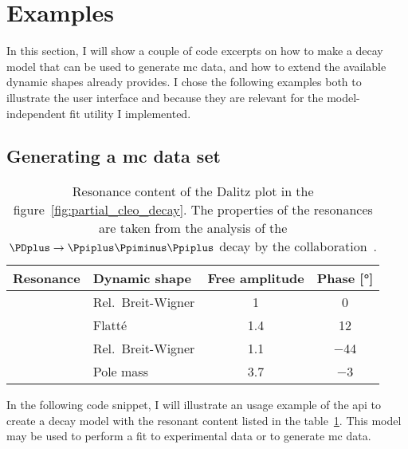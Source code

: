     \section{Examples}

        In this section, I will show a couple of code excerpts on how to make a decay model that can be used to generate \ac{mc} data, and how to extend the available dynamic shapes  already provides.
        I chose the following examples both to illustrate the user interface and because they are relevant for the model-independent fit utility I implemented.

        \subsection{Generating a \acs{mc} data set}
        

        \begin{table}
            \centering
            \caption{Resonance content of the Dalitz plot in the figure~\ref{fig:partial_cleo_decay}. The properties of the resonances are taken from the analysis of the $\PDplus\to\Ppiplus\Ppiminus\Ppiplus$ decay by the \cleo{} collaboration~\cite{PhysRevD.76.012001}.}
            \label{tab:cleo_model}
            \begin{tabular}{llcc}
                \toprule
                Resonance &Dynamic shape &Free amplitude &Phase [\si{\degree}]\\
                \midrule
                \Prhozero{} &Rel.~Breit-Wigner &\num{1}   &\num{0}   \\
                \Pfnez{}    &Flatté            &\num{1.4} &\num{12}  \\
                \Pfofzz{}   &Rel.~Breit-Wigner &\num{1.1} &\num{-44} \\
                \Psigma{}   &Pole mass         &\num{3.7} &\num{-3}  \\
                \bottomrule
            \end{tabular}
        \end{table}
        In the following code snippet, I will illustrate an usage example of the \ac{api} to create a decay model with the resonant content listed in the table~\ref{tab:cleo_model}.
        This model may be used to perform a fit to experimental data or to generate \ac{mc} data.

